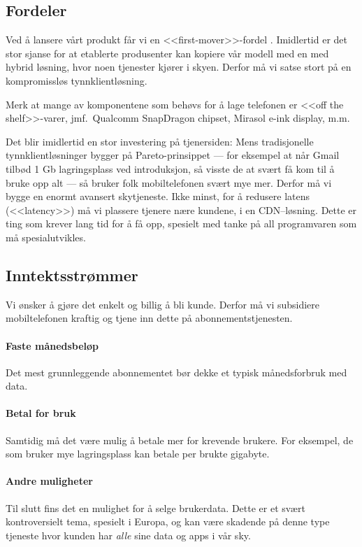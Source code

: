 \subsection{Fordeler}

Ved å lansere vårt produkt får vi en <<first-mover>>-fordel \cite{bessant}.
Imidlertid er det stor sjanse for at etablerte produsenter kan kopiere vår
modell med en med hybrid løsning, hvor noen tjenester kjører i skyen. Derfor må
vi satse stort på en kompromissløs tynnklientløsning.

Merk at mange av komponentene som behøvs for å lage telefonen er <<off the
shelf>>-varer, jmf.~Qualcomm SnapDragon chipset, Mirasol e-ink display, m.m.

Det blir imidlertid en stor investering på tjenersiden: Mens tradisjonelle
tynnklientløsninger bygger på Pareto-prinsippet --- for eksempel at når Gmail
tilbød 1 Gb lagringsplass ved introduksjon, så visste de at svært få kom til å
bruke opp alt --- så bruker folk mobiltelefonen svært mye mer. Derfor må vi
bygge en enormt avansert skytjeneste. Ikke minst, for å redusere latens
(<<latency>>) må vi plassere tjenere nære kundene, i en CDN--løsning. Dette er
ting som krever lang tid for å få opp, spesielt med tanke på all programvaren
som må spesialutvikles.

\subsection{Inntektsstrømmer}

Vi ønsker å gjøre det enkelt og billig å bli kunde. Derfor må vi subsidiere
mobiltelefonen kraftig og tjene inn dette på abonnementstjenesten.

\paragraph{Faste månedsbeløp}
Det mest grunnleggende abonnementet bør dekke et typisk månedsforbruk med data.

\paragraph{Betal for bruk}
Samtidig må det være mulig å betale mer for krevende brukere. For eksempel, de
som bruker mye lagringsplass kan betale per brukte gigabyte.

\paragraph{Andre muligheter}
Til slutt fins det en mulighet for å selge brukerdata. Dette er et svært
kontroversielt tema, spesielt i Europa, og kan være skadende på denne type
tjeneste hvor kunden har \textit{alle} sine data og apps i vår sky.  

